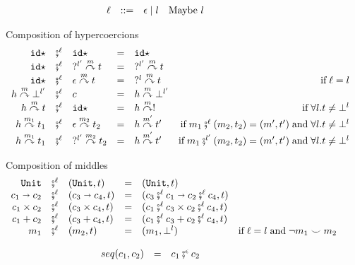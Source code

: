 \documentclass[acmsmall,review,anonymous]{acmart}\settopmatter{printfolios=true,printccs=false,printacmref=false}
\newcommand{\stxrule}[3]{#1 & ::= & #3 & \text{#2}\\}
\newcommand{\funrule}[3]{#1 &=& #2 & #3\\}
\newcommand{\comprule}[4]{#1 & \fatsemi^\ell & #2 & = & #3 & #4 \\}
\newcommand{\plus}[0]{+}
\newcommand{\POOunit}[0]{\mathtt{Unit}}
\newcommand{\POOfun}[2]{#1 \shortrightarrow #2}
\newcommand{\POOprod}[2]{#1 \times #2}
\newcommand{\POOsum}[2]{#1 \plus #2}
\newcommand{\sidecond}[1]{\text{if}\;#1}
\newcommand{\hyperCoercionI}[0]{\mathtt{id\star}}
\newcommand{\hyperCoercionC}[3]{#1 \overset{#2}{\curvearrowright} #3}
\begin{document}
\begin{figure}
	\[
	\begin{array}{rclr}
	\stxrule{\ell}{Maybe $ l $}{\epsilon \mid l}
	\end{array}
	\]
	
	Composition of hypercoercions 
	\[ 
	\begin{array}{rclclr}
	
	\comprule{
		\hyperCoercionI
	}{
		\hyperCoercionI
	}{
		\hyperCoercionI
	}{}
	
	\comprule{
		\hyperCoercionI
	}{
		\hyperCoercionC{?^{l'}}{m}{t}
	}{
		\hyperCoercionC{?^{l'}}{m}{t}
	}{}
	
	\comprule{
		\hyperCoercionI
	}{
		\hyperCoercionC{\epsilon}{m}{t}
	}{
		\hyperCoercionC{?^{l}}{m}{t}
	}{\sidecond{\ell = l}}
	
	\comprule{
		\hyperCoercionC{h}{m}{\bot^{l'}}
	}{
		c
	}{
		\hyperCoercionC{h}{m}{\bot^{l'}}
	}{}
	
	\comprule{
		\hyperCoercionC{h}{m}{t}
	}{
		\hyperCoercionI
	}{
		\hyperCoercionC{h}{m}{!}
	}{
		\sidecond{\forall l. t \neq \bot^{l}}
	}
	
	\comprule{
		\hyperCoercionC{h}{m_1}{t_1}
	}{
		\hyperCoercionC{\epsilon}{m_2}{t_2}
	}{
		\hyperCoercionC{h}{m'}{t'}
	}{
		\sidecond{
			m_1 \fatsemi^{\ell} (m_2, t_2) = (m', t')
			 \; \text{and} \;
			 \forall l. t \neq \bot^{l}
		}
	}
	
	\comprule{
		\hyperCoercionC{h}{m_1}{t_1}
	}{
		\hyperCoercionC{?^{l'}}{m_2}{t_2}
	}{
		\hyperCoercionC{h}{m'}{t'}
	}{
		\sidecond{
			m_1 \fatsemi^{l'} (m_2, t_2) = (m', t')
			\; \text{and} \;
			\forall l. t \neq \bot^{l} 
		}
	}
	\end{array}
	\]
	
	Composition of middles 
	\[ 
	\begin{array}{rclclr}
	\comprule{\POOunit}{(\POOunit,t)}{
		(\POOunit,t)
	}{}
	\comprule{\POOfun{c_1}{c_2}}{(\POOfun{c_3}{c_4},t)}{
		(\POOfun{c_3 \fatsemi^{\ell} c_1}{c_2 \fatsemi^\ell c_4},t)
	}{}
	\comprule{\POOprod{c_1}{c_2}}{(\POOprod{c_3}{c_4},t)}{
		(\POOprod{c_1 \fatsemi^\ell c_3}{c_2 \fatsemi^\ell c_4},t)
	}{}
	\comprule{\POOsum{c_1}{c_2}}{(\POOsum{c_3}{c_4},t)}{
		(\POOsum{c_1 \fatsemi^\ell c_3}{c_2 \fatsemi^\ell c_4},t)
	}{}
	\comprule{m_1}{(m_2,t)}{
		(m_1,\bot^l)
	}{
		\sidecond{
			\ell = l \; \text{and} \;
			\neg m_1 \smile m_2 
		}
	}
	\end{array}
	\]
	
	\[
	\begin{array}{rclr}
	\funrule{seq(c_1,c_2)}{
		c_1 \fatsemi^\epsilon c_2
	}{}
	\end{array}
	\]
	

\end{figure}
\end{document}
